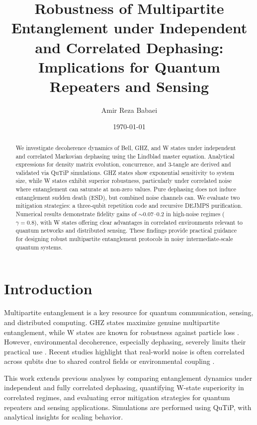 \documentclass[apl, twocolumn, superscriptaddress, showpacs, floatfix]{revtex4-2}
\begin{document}
\title{Robustness of Multipartite Entanglement under Independent and Correlated Dephasing: Implications for Quantum Repeaters and Sensing}

\author{Amir Reza Babaei}

\date{\today}

\begin{abstract}
We investigate decoherence dynamics of Bell, GHZ, and W states under independent and correlated Markovian dephasing using the Lindblad master equation. Analytical expressions for density matrix evolution, concurrence, and 3-tangle are derived and validated via QuTiP simulations. GHZ states show exponential sensitivity to system size, while W states exhibit superior robustness, particularly under correlated noise where entanglement can saturate at non-zero values. Pure dephasing does not induce entanglement sudden death (ESD), but combined noise channels can. We evaluate two mitigation strategies: a three-qubit repetition code and recursive DEJMPS purification. Numerical results demonstrate fidelity gains of $\sim$0.07--0.2 in high-noise regimes ($\gamma=0.8$), with W states offering clear advantages in correlated environments relevant to quantum networks and distributed sensing. These findings provide practical guidance for designing robust multipartite entanglement protocols in noisy intermediate-scale quantum systems.
\end{abstract}

\maketitle

\section{Introduction}
Multipartite entanglement is a key resource for quantum communication, sensing, and distributed computing. GHZ states maximize genuine multipartite entanglement, while W states are known for robustness against particle loss \cite{dur2000}. However, environmental decoherence, especially dephasing, severely limits their practical use \cite{yu2009}. Recent studies highlight that real-world noise is often correlated across qubits due to shared control fields or environmental coupling \cite{brockerhoff2025,zang2024}.

This work extends previous analyses by comparing entanglement dynamics under independent and fully correlated dephasing, quantifying W-state superiority in correlated regimes, and evaluating error mitigation strategies for quantum repeaters and sensing applications. Simulations are performed using QuTiP, with analytical insights for scaling behavior.
\end{document}
